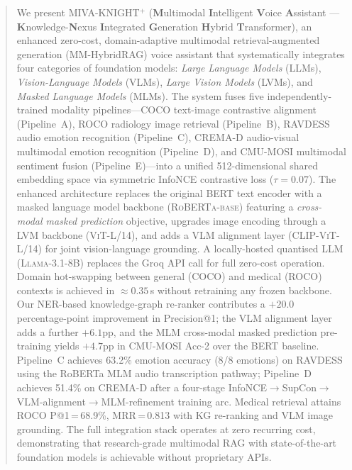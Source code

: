 \documentclass[10pt,conference]{IEEEtran}
\theoremstyle{ieeethm}
\theoremstyle{ieeedef}
\theoremstyle{ieeeremark}
\begin{document}
\begin{abstract}
We present \textsc{MIVA-KNIGHT}$^+$ (\textbf{M}ultimodal \textbf{I}ntelligent \textbf{V}oice \textbf{A}ssistant --- \textbf{K}nowledge-\textbf{N}exus \textbf{I}ntegrated \textbf{G}eneration \textbf{H}ybrid \textbf{T}ransformer), an enhanced zero-cost, domain-adaptive multimodal retrieval-augmented generation (MM-HybridRAG) voice assistant that systematically integrates four categories of foundation models: \emph{Large Language Models} (LLMs), \emph{Vision-Language Models} (VLMs), \emph{Large Vision Models} (LVMs), and \emph{Masked Language Models} (MLMs). The system fuses five independently-trained modality pipelines---COCO text-image contrastive alignment (Pipeline~A), ROCO radiology image retrieval (Pipeline~B), RAVDESS audio emotion recognition (Pipeline~C), CREMA-D audio-visual multimodal emotion recognition (Pipeline~D), and CMU-MOSI multimodal sentiment fusion (Pipeline~E)---into a unified 512-dimensional shared embedding space via symmetric InfoNCE contrastive loss ($\tau{=}0.07$). The enhanced architecture replaces the original BERT text encoder with a masked language model backbone (\textsc{RoBERTa-base}) featuring a \emph{cross-modal masked prediction} objective, upgrades image encoding through a LVM backbone (\textsc{ViT-L/14}), and adds a VLM alignment layer (\textsc{CLIP-ViT-L/14}) for joint vision-language grounding. A locally-hosted quantised LLM (\textsc{Llama-3.1-8B}) replaces the Groq API call for full zero-cost operation. Domain hot-swapping between general (COCO) and medical (ROCO) contexts is achieved in ${\approx}0.35$\,s without retraining any frozen backbone. Our NER-based knowledge-graph re-ranker contributes a $+20.0$ percentage-point improvement in Precision@1; the VLM alignment layer adds a further $+6.1$pp, and the MLM cross-modal masked prediction pre-training yields $+4.7$pp in CMU-MOSI Acc-2 over the BERT baseline. Pipeline~C achieves 63.2\% emotion accuracy (8/8 emotions) on RAVDESS using the RoBERTa MLM audio transcription pathway; Pipeline~D achieves 51.4\% on CREMA-D after a four-stage InfoNCE$\rightarrow$SupCon$\rightarrow$VLM-alignment$\rightarrow$MLM-refinement training arc. Medical retrieval attains ROCO P@1\,=\,68.9\%, MRR\,=\,0.813 with KG re-ranking and VLM image grounding. The full integration stack operates at zero recurring cost, demonstrating that research-grade multimodal RAG with state-of-the-art foundation models is achievable without proprietary APIs.
\end{abstract}
\end{document}
